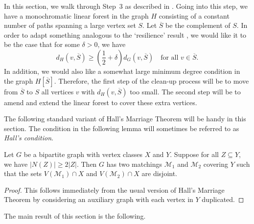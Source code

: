\documentclass[10pt,a4paper,reqno]{amsart}
\begin{document}
In this section, we walk through Step~3 as described in . Going into this step, we have a monochromatic linear forest in the graph $H$ consisting of a constant number of paths spanning a large vertex set $S$. Let $\overline{S}$ be the complement of $S$. In order to adapt something analogous to the `resilience' result \cite[Theorem~1.6]{Montgomery2019resilient}, we would like it to be the case that for some $\delta > 0$, we have
\[
    d_{H}\left(v,\overline{S}\right) \ge \left(\frac{1}{2} + \delta\right)d_{G}(v, \overline{S})  \quad \text{for all } v \in \overline{S}.
\]
In addition, we would also like a somewhat large minimum degree condition in the graph $H[\overline{S}]$. Therefore, the first step of the clean-up process will be to move from $\overline{S }$  to $S$ all vertices $v$ with $d_H\left(v,\overline{S}\right)$ too small. The second step will be to amend and extend the linear forest to cover these extra vertices.

The following standard variant of Hall's Marriage Theorem will be handy in this section. The condition in the following lemma will sometimes be referred to as \emph{Hall's condition}.
\begin{lemma}\label{thm:Hall_variant}
    Let $G$ be a bipartite graph with vertex classes $X$ and $Y$. Suppose for all $Z \subseteq Y$, we have $|N(Z)| \ge 2|Z|$. Then $G$ has two matchings $\mathcal{M}_1$ and $\mathcal{M}_2$ covering $Y$ such that the sets $V(\mathcal{M}_1)\cap X$ and $V(\mathcal{M}_2)\cap X$ are disjoint.
\end{lemma}
\begin{proof}
This follows immediately from the usual version of Hall's Marriage Theorem by considering an auxiliary graph with each vertex in $Y$ duplicated.
\end{proof}

The main result of this section is the following. 
\end{document}
